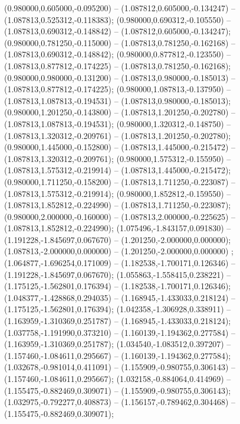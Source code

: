  (0.980000,0.605000,-0.095200) -- (1.087812,0.605000,-0.134247) -- (1.087813,0.525312,-0.118383);
 (0.980000,0.690312,-0.105550) -- (1.087813,0.690312,-0.148842) -- (1.087812,0.605000,-0.134247);
 (0.980000,0.781250,-0.115000) -- (1.087813,0.781250,-0.162168) -- (1.087813,0.690312,-0.148842);
 (0.980000,0.877812,-0.123550) -- (1.087813,0.877812,-0.174225) -- (1.087813,0.781250,-0.162168);
 (0.980000,0.980000,-0.131200) -- (1.087813,0.980000,-0.185013) -- (1.087813,0.877812,-0.174225);
 (0.980000,1.087813,-0.137950) -- (1.087813,1.087813,-0.194531) -- (1.087813,0.980000,-0.185013);
 (0.980000,1.201250,-0.143800) -- (1.087813,1.201250,-0.202780) -- (1.087813,1.087813,-0.194531);
 (0.980000,1.320312,-0.148750) -- (1.087813,1.320312,-0.209761) -- (1.087813,1.201250,-0.202780);
 (0.980000,1.445000,-0.152800) -- (1.087813,1.445000,-0.215472) -- (1.087813,1.320312,-0.209761);
 (0.980000,1.575312,-0.155950) -- (1.087813,1.575312,-0.219914) -- (1.087813,1.445000,-0.215472);
 (0.980000,1.711250,-0.158200) -- (1.087813,1.711250,-0.223087) -- (1.087813,1.575312,-0.219914);
 (0.980000,1.852812,-0.159550) -- (1.087813,1.852812,-0.224990) -- (1.087813,1.711250,-0.223087);
 (0.980000,2.000000,-0.160000) -- (1.087813,2.000000,-0.225625) -- (1.087813,1.852812,-0.224990);
 (1.075496,-1.843157,0.091830) -- (1.191228,-1.845697,0.067670) -- (1.201250,-2.000000,0.000000);
 (1.087813,-2.000000,0.000000) -- (1.201250,-2.000000,0.000000) ;
 (1.064877,-1.696254,0.171009) -- (1.182538,-1.700171,0.126346) -- (1.191228,-1.845697,0.067670);
 (1.055863,-1.558415,0.238221) -- (1.175125,-1.562801,0.176394) -- (1.182538,-1.700171,0.126346);
 (1.048377,-1.428868,0.294035) -- (1.168945,-1.433033,0.218124) -- (1.175125,-1.562801,0.176394);
 (1.042358,-1.306928,0.338911) -- (1.163959,-1.310369,0.251787) -- (1.168945,-1.433033,0.218124);
 (1.037758,-1.191990,0.373210) -- (1.160139,-1.194362,0.277584) -- (1.163959,-1.310369,0.251787);
 (1.034540,-1.083512,0.397207) -- (1.157460,-1.084611,0.295667) -- (1.160139,-1.194362,0.277584);
 (1.032678,-0.981014,0.411091) -- (1.155909,-0.980755,0.306143) -- (1.157460,-1.084611,0.295667);
 (1.032158,-0.884064,0.414969) -- (1.155475,-0.882469,0.309071) -- (1.155909,-0.980755,0.306143);
 (1.032975,-0.792277,0.408873) -- (1.156157,-0.789462,0.304468) -- (1.155475,-0.882469,0.309071);
